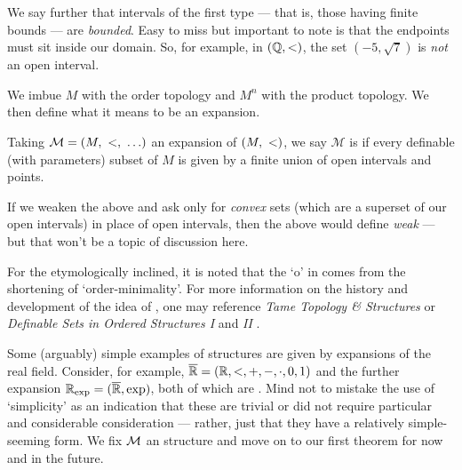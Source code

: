 We say further that intervals of the first type — that is, those having finite bounds — are \emph{bounded}. Easy to miss but important to note is that the endpoints must sit inside our domain. So, for example, in $(\mathbb{Q}, <)$, the set $(-5, \sqrt{7})$ is \emph{not} an open interval.

We imbue $M$ with the order topology and $M^n$ with the product topology. We then define what it means to be an \om expansion.

\begin{definition}[\Om expansion]
  Taking $\mathcal{M} = (M, \ <, \ \hdots)$ an expansion of $(M, \ <)$, we say $\mathcal{M}$ is \om if every definable (with parameters) subset of $M$ is given by a finite union of open intervals and points.
\end{definition}

\begin{svgraybox}
  If we weaken the above and ask only for \emph{convex} sets (which are a superset of our open intervals) in place of open intervals, then the above would define \emph{weak \omy} — but that won't be a topic of discussion here.
\end{svgraybox}

For the etymologically inclined, it is noted that the `o' in \om comes from the shortening of `order-minimality'. For more information on the history and development of the idea of \omy, one may reference
\textit{Tame Topology \& \Om Structures} \cite{dries_tame_1998} or \textit{Definable Sets in Ordered Structures I} \cite{pillay_definable_1986} and \textit{II} \cite{knight_definable_1986}.


Some (arguably) simple examples of \om structures are given by expansions of the real field. Consider, for example, $\overline{\mathbb{R}} = (\mathbb{R}, <, +, -, \cdot, 0, 1)$ and the further expansion $\mathbb{R}_{\textrm{exp}} = (\overline{\mathbb{R}}, \exp)$, both of which are \om. Mind not to mistake the use of `simplicity' as an indication that these are trivial or did not require particular and considerable consideration — rather, just that they have a relatively simple-seeming form. We fix $\mathcal{M}$ an \om structure and move on to our first theorem for now and in the future.
